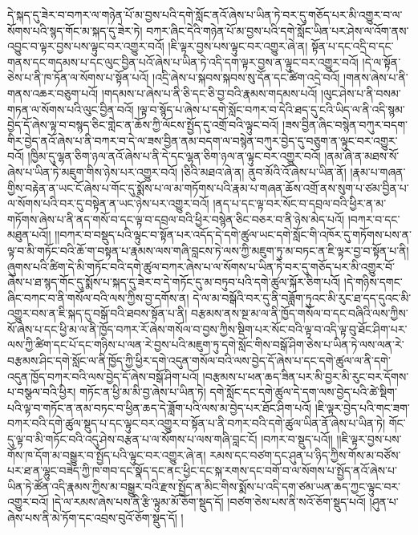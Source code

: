 དེ་སྐད་དུ་ཟེར་བ་བཀར་ལ་གཉེན་པོ་མ་བྱས་པའི་དགེ་སློང་ནའོ་ཞེས་པ་ཡིན་ཏེ་བར་དུ་གཅོད་པར་མི་འགྱུར་བ་ལ་སོགས་པའི་སྙད་གོང་མ་སྐད་དུ་ཟེར་ཏེ། བཀར་ཞིང་དེའི་གཉེན་པོ་མ་བྱས་པའི་དགེ་སློང་ཡིན་པར་ཤེས་ལ་འོག་ནས་འབྱུང་བ་ལྟར་བྱས་པས་ལྟུང་བར་འགྱུར་བའོ། །ཇི་ལྟར་བྱས་པས་ལྟུང་བར་འགྱུར་ཞེ་ན། སྟོན་པ་དང་འདྲི་བ་དང་གནས་དང་གདམས་པ་དང་ལུང་བྱིན་པའོ་ཞེས་པ་ཡིན་ཏེ་འདི་དག་ལྟར་བྱས་ན་ལྟུང་བར་འགྱུར་བའོ། །དེ་ལ་སྟོན་ཅེས་པ་ནི་ཁ་ཏོན་ལ་སོགས་པ་སྟོན་པའོ། །འདྲི་ཞེས་པ་སྐབས་སྐབས་སུ་དོན་དང་ཚིག་འདྲེ་བའོ། །གནས་ཞེས་པ་ནི་གནས་འཆར་བཅུག་པའོ། །གདམས་པ་ཞེས་པ་ནི་ཅི་དང་ཅི་བྱ་བའི་རྣམས་གདམས་པའོ། །ལུང་ཤེས་པ་ནི་བསམ་གཏན་ལ་སོགས་པའི་ལུང་བྱིན་བའོ། །ལྟ་བ་སྙོད་པ་ཞེས་པ་དགེ་སློང་བཀར་བ་དེའི་ཐད་དུ་ངའི་ཡིད་ལ་ནི་འདི་སྙམ་བྱེད་དོ་ཞེས་ལྟ་བ་བསྙད་ཅིང་གླེང་ན་ཆོས་ཀྱི་ལོངས་སྤྱོད་དུ་འགྲོ་བའི་ལྟུང་བའོ། །ཟས་བྱིན་ཞིང་བསྙེན་བཀུར་བདག་གིར་བྱེད་ནའོ་ཞེས་པ་ནི་བཀར་བ་དེ་ལ་ཟས་བྱིན་ནམ་བདག་ལ་བསྙེན་བཀུར་བྱེད་དུ་བཅུག་ན་ལྟུང་བར་འགྱུར་བའོ། །ཁྱིམ་དུ་ལྷན་ཅིག་ཉལ་ནའོ་ཞེས་པ་ནི་དེ་དང་ལྷན་ཅིག་ཉལ་ན་ལྟུང་བར་འགྱུར་བའོ། །ནམ་ཞེ་ན་མཐས་སོ་ཞེས་པ་ཡིན་ཏེ་མཇུག་གིས་ཉེས་པར་འགྱུར་བའོ། །ཅིའི་མཐའ་ཞེ་ན། ནུབ་མོའི་འོ་ཞེས་པ་ཡིན་ནོ། །རྣམ་པ་གཞན་གྱིས་བརྟེན་ན་ཡང་ངོ་ཞེས་པ་གོང་དུ་སྨོས་པ་ལ་མ་གཏོགས་པའི་རྣམ་པ་གཞན་ཆོས་འགྲོ་ནས་སུག་པ་ཙམ་བྱིན་པ་ལ་སོགས་པའི་བར་དུ་བསྟེན་ན་ཡང་ཉེས་པར་འགྱུར་བའོ། །ནད་པ་དང་ལྟ་བར་སོང་བ་དབྲལ་བའི་ཕྱིར་ན་མ་གཏོགས་ཞེས་པ་ནི་ནད་གསོ་བ་དང་ལྟ་བ་དབྲལ་བའི་ཕྱིར་བསྙེན་ཅིང་བཅར་བ་ནི་ཉེས་མེད་པའོ། །བཀར་བ་དང་མཐུན་པའོ།། །།བཀར་བ་བསྡུད་པའི་ལྟུང་བ་སྟོན་པར་འདོད་དེ་དགེ་ཚུལ་ཡང་དགེ་སློང་གི་འཁོར་དུ་གཏོགས་པས་ན་ལྟ་བ་མི་གཏོང་བའི་ཆོ་ག་བསྟན་པ་རྣམས་ལས་གཞི་བླངས་ཏེ་ལས་ཀྱི་མཇུག་ཏུ་མ་བཏང་ན་ཇི་ལྟར་བྱ་བ་སྟོན་པ་ནི། ཞུགས་པའི་ཚིག་དེ་མི་གཏོང་བའི་དགེ་ཚུལ་བཀར་ཞེས་པ་ལ་སོགས་པ་ཡིན་ཏེ་བར་དུ་གཅོད་པར་མི་འགྱུར་བོ་ཞེས་པ་ཐ་སྙད་གོང་དུ་སྨོས་པ་སྐད་དུ་ཟེར་བ་དེ་གཏོང་དུ་མ་བཏུབ་པའི་དགེ་ཚུལ་སྐོར་ཅིག་པའོ། །དེ་གཉིས་དགང་ཞིང་བཀང་བ་ནི་གསོལ་བའི་ལས་ཀྱིས་བྱ་དགོས་ན། དེ་ལ་མ་བསྒོའི་བར་དུ་ནི་བཟློག་ཏུའང་མི་རུང་ཐ་དད་དུའང་མི་འགྱུར་བས་ན་ཇི་སྐད་དུ་བསྒོ་བའི་ཐབས་སྟོན་པ་ནི། བརྩམས་ནས་སྔ་མ་ལ་ནི་ཁྱོད་གསོལ་བ་དང་བཞིའི་ལས་ཀྱིས་སོ་ཞེས་པ་དང་ཕྱི་མ་ལ་ནི་ཁྱོད་བཀར་རོ་ཞེས་གསོལ་བ་བྱས་ཀྱིས་སྡིག་པར་སོང་བའི་ལྟ་བ་འདི་ལྟ་བུ་ཐོང་ཤིག་པར་ལས་ཀྱི་ཚིག་དང་པོ་དང་གཉིས་པ་ལན་རེ་བྱས་པའི་མཇུག་ཏུ་དགེ་སློང་གིས་བསྒོ་ཤིག་ཅེས་པ་ཡིན་ཏེ་ལས་ལན་རེ་བརྩམས་ཤིང་དགེ་སློང་ལ་ནི་ཁྱོད་ཀྱི་ཕྱིར་དགེ་འདུན་གསོལ་བའི་ལས་བྱེད་དོ་ཞེས་པ་དང་དགེ་ཚུལ་ལ་ནི་དགེ་འདུན་ཁྱོད་བཀར་བའི་ལས་བྱེད་དོ་ཞེས་བསྒོ་ཤིག་པའོ། །བརྩམས་པ་ཕན་ཆད་ཟིན་པར་མི་བྱར་མི་རུང་བར་དོགས་པ་བསྩལ་བའི་ཕྱིར། གཏོང་ན་ཕྱི་མ་མི་བྱ་ཞེས་པ་ཡིན་ཏེ། དགེ་སློང་དང་དགེ་ཚུལ་དེ་དག་ལས་བྱེད་པའི་ཚེ་སྡིག་པའི་ལྟ་བ་གཏོང་ན་ནམ་བཏང་བ་ཕྱིན་ཆད་དེ་ཟློག་པའི་ལས་མ་བྱེད་པར་ཐོང་ཤིག་པའོ། །ཇི་ལྟར་བྱེད་པའི་གང་ཟག་བཀར་བའི་དགེ་ཚུལ་སྡུད་པ་དང་ལྟུང་བར་འགྱུར་བ་སྟོན་པ་ནི་བཀར་བའི་དགེ་ཚུལ་ཡིན་ནོ་ཞེས་པ་ཡིན་ཏེ། གོང་དུ་ལྟ་བ་མི་གཏོང་བའི་འདུ་ཤེས་བརྩན་པ་ལ་སོགས་པ་ལས་གཞི་བླང་ངོ། །བཀར་བ་སྡུད་པའོ།། །།ཇི་ལྟར་བྱས་པས་གོས་ཁ་དོག་མ་བསྒྱུར་བ་སྤྱོད་པའི་ལྟུང་བར་འགྱུར་ཞེ་ན། རམས་དང་བཙག་དང་ཤུན་པ་ཉིད་ཀྱིས་གོས་མ་བཙོས་པར་ཐ་ན་ལྷུང་བཟེད་ཀྱི་ཁ་གབ་དང་སྣོད་དང་ནང་ཕྱིང་དང་སྐ་རགས་དང་བགོ་བ་ལ་སོགས་པ་སྤྱོད་ནའོ་ཞེས་པ་ཡིན་ཏེ་ཚོན་འདི་རྣམས་ཀྱིས་མ་བསྒྱུར་བའི་རྫས་སྤྱོད་ན་མིང་གིས་སྨོས་པ་འདི་དག་ཙམ་ཡན་ཆད་ཀྱང་ལྟུང་བར་འགྱུར་བའོ། །དེ་ལ་རམས་ཞེས་པས་ནི་རྩི་ལྟུམ་མོ་ཅོག་སྡུད་དོ། །བཙག་ཅེས་པས་ནི་སའོ་ཅོག་སྡུད་པའོ། །ཤུན་པ་ཞེས་པས་ནི་མེ་ཏོག་དང་འབྲས་བུའོ་ཅོག་སྡུད་དོ། །

